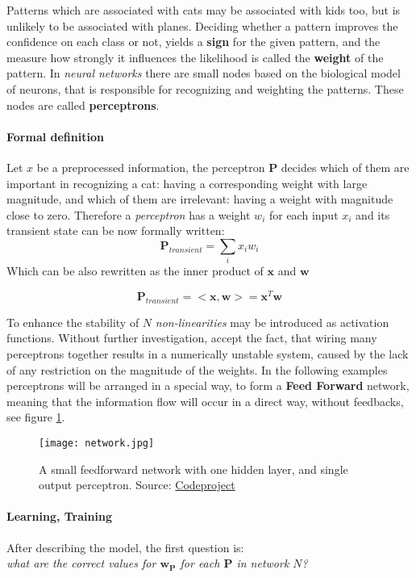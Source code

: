 Patterns which are associated with cats may be associated with kids too, but is unlikely to be associated with planes. Deciding whether a pattern improves the confidence on each class or not, yields a \textbf{sign} for the given pattern, and the measure how strongly it influences the likelihood is called the \textbf{weight} of the pattern.
In \emph{neural networks} there are small nodes based on the biological model of neurons, that is responsible for recognizing and weighting the patterns. These nodes are called \textbf{perceptrons}. 

\paragraph{Formal definition} 
Let $x$ be a preprocessed information, the perceptron $\mathbf{P}$ decides which of them are important in recognizing a cat: having a corresponding weight with large magnitude, and which of them are irrelevant: having a weight with magnitude close to zero. 
Therefore a \emph{perceptron} has a weight $w_i$ for each input $x_i$ and its transient state can be now formally written:
$$
	\mathbf{P}_{transient}=\sum_i x_i w_i
$$
Which can be also rewritten as the inner product of $\mathbf{x}$ and $\mathbf{w}$

$$
	\mathbf{P}_{transient}=<\mathbf{x}, \mathbf{w}>=\mathbf{x}^T\mathbf{w}
$$

To enhance the stability of $N$  \emph{non-linearities} may be introduced as activation functions. Without further investigation, accept the fact, that wiring many perceptrons together results in a numerically unstable system, caused by the lack of any restriction on the magnitude of the weights. In the following examples perceptrons will be arranged in a special way, to form a \textbf{Feed Forward} network, meaning that the information flow will occur in a direct way, without feedbacks, see figure \ref{fig:ff}.

\begin{figure}
	\centering
	\texttt{[image: network.jpg]}
	\caption{A small feedforward network with one hidden layer, and single output perceptron.
	Source: \href{http://www.codeproject.com/KB/dotnet/predictor/network.jpg}{Codeproject} 	}
	\label{fig:ff}
\end{figure}

\paragraph{Learning, Training}
After describing the model, the first question is:\\
\emph{what are the correct values for $\mathbf{w_P}$ for each $\mathbf{P}$ in network $N$?}

